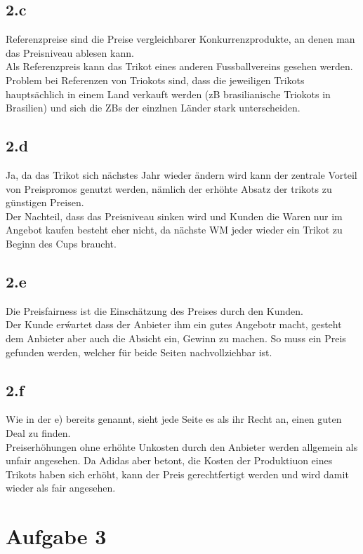 \subsection{2.c}
    Referenzpreise sind die Preise vergleichbarer Konkurrenzprodukte, an denen man das Preisniveau ablesen kann. \\
    Als Referenzpreis kann das Trikot eines anderen Fussballvereins gesehen werden. Problem bei Referenzen von Triokots sind, dass die jeweiligen Trikots hauptsächlich in einem Land verkauft werden
    (zB brasilianische Triokots in Brasilien) und sich die ZBs der einzlnen Länder stark unterscheiden.

\subsection{2.d}
    Ja, da das Trikot sich nächstes Jahr wieder ändern wird kann der zentrale Vorteil von Preispromos genutzt werden, nämlich der erhöhte Absatz der trikots zu günstigen Preisen. \\
    Der Nachteil, dass das Preisniveau sinken wird und Kunden die Waren nur im Angebot kaufen besteht eher nicht, da nächste WM jeder wieder ein Trikot zu Beginn des Cups braucht.

\subsection{2.e}
    Die Preisfairness ist die Einschätzung des Preises durch den Kunden. \\
    Der Kunde erẃartet dass der Anbieter ihm ein gutes Angebotr macht, gesteht dem Anbieter aber auch die Absicht ein, 
    Gewinn zu machen. So muss ein Preis gefunden werden, welcher für beide Seiten nachvollziehbar ist.

\subsection{2.f}
    Wie in der e) bereits genannt, sieht jede Seite es als ihr Recht an, einen guten Deal zu finden. \\
    Preiserhöhungen ohne erhöhte Unkosten durch den Anbieter werden allgemein als unfair angesehen. 
    Da Adidas aber betont, die Kosten der Produktiuon eines Trikots haben sich erhöht, 
    kann der Preis gerechtfertigt werden und wird damit wieder als fair angesehen.



\section{Aufgabe 3}

